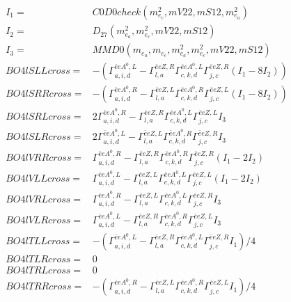 \documentclass[A4,landscape]{article}
\begin{document}
\begin{align} 
I_1 = & C0D0check(m^2_{e_{{c}}}, mV22, mS12, m^2_{e_{{a}}}) \\ 
I_2 = & D_{27}(m^2_{e_{{a}}}, m^2_{e_{{c}}}, mV22, mS12) \\ 
I_3 = & MMD0(m_{e_{{a}}}, m_{e_{{c}}}, m^2_{e_{{a}}}, m^2_{e_{{c}}}, mV22, mS12) \\ 
  BO4lSLLcross= & -( \Gamma^{\bar{e}e A^0 ,L}_{a, i, d} - \Gamma^{\bar{e}e Z ,R} _{l, a} \Gamma^{\bar{e}e A^0 ,L}_{c, k, d} \Gamma^{\bar{e}e Z ,R}_{j, c} (I_1 - 8 I_2)) \\ 
  BO4lSRRcross= & -( \Gamma^{\bar{e}e A^0 ,R}_{a, i, d} - \Gamma^{\bar{e}e Z ,L} _{l, a} \Gamma^{\bar{e}e A^0 ,R}_{c, k, d} \Gamma^{\bar{e}e Z ,L}_{j, c} (I_1 - 8 I_2)) \\ 
  BO4lSRLcross= & 2  \Gamma^{\bar{e}e A^0 ,R}_{a, i, d} - \Gamma^{\bar{e}e Z ,R} _{l, a} \Gamma^{\bar{e}e A^0 ,L}_{c, k, d} \Gamma^{\bar{e}e Z ,L}_{j, c} I_3 \\ 
  BO4lSLRcross= & 2  \Gamma^{\bar{e}e A^0 ,L}_{a, i, d} - \Gamma^{\bar{e}e Z ,L} _{l, a} \Gamma^{\bar{e}e A^0 ,R}_{c, k, d} \Gamma^{\bar{e}e Z ,R}_{j, c} I_3 \\ 
  BO4lVRRcross= &  \Gamma^{\bar{e}e A^0 ,R}_{a, i, d} - \Gamma^{\bar{e}e Z ,R} _{l, a} \Gamma^{\bar{e}e A^0 ,R}_{c, k, d} \Gamma^{\bar{e}e Z ,R}_{j, c} (I_1 - 2 I_2) \\ 
  BO4lVLLcross= &  \Gamma^{\bar{e}e A^0 ,L}_{a, i, d} - \Gamma^{\bar{e}e Z ,L} _{l, a} \Gamma^{\bar{e}e A^0 ,L}_{c, k, d} \Gamma^{\bar{e}e Z ,L}_{j, c} (I_1 - 2 I_2) \\ 
  BO4lVRLcross= &  \Gamma^{\bar{e}e A^0 ,R}_{a, i, d} - \Gamma^{\bar{e}e Z ,L} _{l, a} \Gamma^{\bar{e}e A^0 ,L}_{c, k, d} \Gamma^{\bar{e}e Z ,R}_{j, c} I_3 \\ 
  BO4lVLRcross= &  \Gamma^{\bar{e}e A^0 ,L}_{a, i, d} - \Gamma^{\bar{e}e Z ,R} _{l, a} \Gamma^{\bar{e}e A^0 ,R}_{c, k, d} \Gamma^{\bar{e}e Z ,L}_{j, c} I_3 \\ 
  BO4lTLLcross= & -( \Gamma^{\bar{e}e A^0 ,L}_{a, i, d} - \Gamma^{\bar{e}e Z ,R} _{l, a} \Gamma^{\bar{e}e A^0 ,L}_{c, k, d} \Gamma^{\bar{e}e Z ,R}_{j, c} I_1)/4 \\ 
  BO4lTLRcross= & 0 \\ 
  BO4lTRLcross= & 0 \\ 
  BO4lTRRcross= & -( \Gamma^{\bar{e}e A^0 ,R}_{a, i, d} - \Gamma^{\bar{e}e Z ,L} _{l, a} \Gamma^{\bar{e}e A^0 ,R}_{c, k, d} \Gamma^{\bar{e}e Z ,L}_{j, c} I_1)/4 \\ 
\end{align} 
\end{document}
